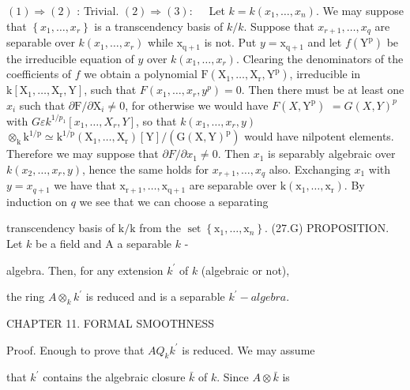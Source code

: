 $(1) \Rightarrow(2)$ : Trivial. $(2) \Rightarrow(3): \quad$ Let $k=k\left(x_{1}, \ldots, x_{n}\right)$. We may suppose that $\left\{x_{1}, \ldots, x_{r}\right\}$ is a transcendency basis of $k / k$. Suppose that $x_{r+1}, \ldots, x_{q}$ are separable over $k\left(x_{1}, \ldots, x_{r}\right)$ while $\mathrm{x}_{\mathrm{q}+1}$ is not. Put $y=\mathrm{x}_{\mathrm{q}+1}$ and let $f\left(\mathrm{Y}^{\mathrm{p}}\right)$ be the irreducible equation of $y$ over $k\left(x_{1}, \ldots, x_{r}\right)$. Clearing the denominators of the coefficients of $f$ we obtain a polynomial $\mathrm{F}\left(\mathrm{X}_{1}, \ldots, \mathrm{X}_{\mathrm{r}}, \mathrm{Y}^{\mathrm{p}}\right)$, irreducible in $\mathrm{k}\left[\mathrm{X}_{1}, \ldots, \mathrm{X}_{\mathrm{r}}, \mathrm{Y}\right]$, such that $F\left(x_{1}, \ldots, x_{r}, y^{p}\right)=0$. Then there must be at least one $x_{i}$ such that $\partial \mathrm{F} / \partial \mathrm{X}_{i} \neq 0$, for otherwise we would have $F\left(X, \mathrm{Y}^{\mathrm{p}}\right)$ $=G(X, Y)^{p}$ with $G \varepsilon k^{1 / p_{1}}\left[x_{1}, \ldots, X_{r}, Y\right]$, so that $k\left(x_{1}, \ldots, x_{r}, y\right)$ $\otimes_{\mathrm{k}} \mathrm{k}^{1 / \mathrm{p}} \simeq \mathrm{k}^{1 / \mathrm{p}}\left(\mathrm{X}_{1}, \ldots, \mathrm{X}_{\mathrm{r}}\right)[\mathrm{Y}] /\left(\mathrm{G}(\mathrm{X}, \mathrm{Y})^{\mathrm{p}}\right)$ would have nilpotent elements. Therefore we may suppose that $\partial F / \partial x_{1} \neq 0$. Then $x_{1}$ is separably algebraic over $k\left(x_{2}, \ldots, x_{r}, y\right)$, hence the same holds for $x_{r+1}, \ldots, x_{q}$ also. Exchanging $x_{1}$ with $y=x_{q+1}$ we have that $\mathrm{x}_{\mathrm{r}+1}, \ldots, \mathrm{x}_{\mathrm{q}+1}$ are separable over $\mathrm{k}\left(\mathrm{x}_{1}, \ldots, \mathrm{x}_{\mathrm{r}}\right)$. By induction on $q$ we see that we can choose a separating

transcendency basis of $\mathrm{k} / \mathrm{k}$ from the $\operatorname{set}\left\{\mathrm{x}_{1}, \ldots, \mathrm{x}_{n}\right\}$. (27.G) PROPOSITION. Let $k$ be a field and A a separable $k$ -

algebra. Then, for any extension $k^{\prime}$ of $k$ (algebraic or not),

the ring $A \otimes_{k} k^{\prime}$ is reduced and is a separable $k^{\prime}-a l g e b r a .$

CHAPTER 11. FORMAL SMOOTHNESS

Proof. Enough to prove that $A Q_{k} k^{\prime}$ is reduced. We may assume

that $k^{\prime}$ contains the algebraic closure $\bar{k}$ of $k$. Since $A \otimes \bar{k}$ is

